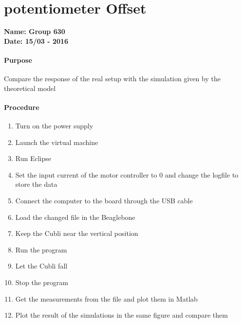 \chapter{potentiometer Offset}\label{potentiometerOffset} 
\textbf{Name: Group 630}\\
\textbf{Date: 15/03 - 2016}

\subsubsection{Purpose}
Compare the response of the real setup with the simulation given by the theoretical model

\subsubsection{Procedure}
\begin{enumerate}
	\item Turn on the power supply
	\item Launch the virtual machine
	\item Run Eclipse
	\item Set the input current of the motor controller to 0 and change the logfile to store the data
	\item Connect the computer to the board through the USB cable
	\item Load the changed file in the Beaglebone
	\item Keep the Cubli near the vertical position
	\item Run the program
	\item Let the Cubli fall
	\item Stop the program
	\item Get the measurements from the file and plot them in Matlab
	\item Plot the result of the simulations in the same figure and compare them

\end{enumerate}

